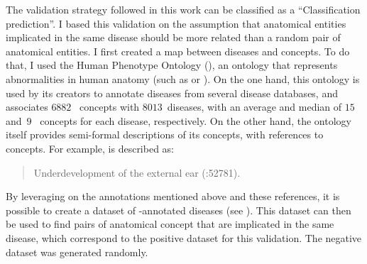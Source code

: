 The validation strategy followed in this work can be classified as a ``Classification prediction''. I based this validation on the assumption that anatomical entities implicated in the same disease should be more related than a random pair of anatomical entities. I first created a map between diseases and  concepts. To do that, I used the Human Phenotype Ontology (), an ontology that represents abnormalities in human anatomy (such as  or ). On the one hand, this ontology is used by its creators to annotate diseases from several disease databases, and associates $6882$ ~concepts with $8013$~diseases, with an average and median of $15$ and~$9$ ~concepts for each disease, respectively. On the other hand, the ontology itself provides semi-formal descriptions of its concepts, with references to  concepts. For example,  is described as:
\begin{quote}
    Underdevelopment of the external ear (:52781).
\end{quote}
By leveraging on the annotations mentioned above and these  references, it is possible to create a dataset of -annotated diseases (see ). This dataset can then be used to find pairs of anatomical concept that are implicated in the same disease, which correspond to the positive dataset for this validation. The negative dataset was generated randomly.

